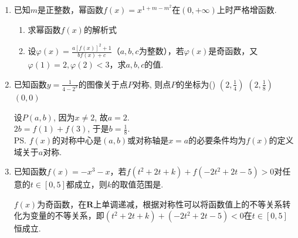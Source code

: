 \begin{enumerate}
\begin{jieda}
    \ps 任意一个关于定义域关于原点对称的函数都可以写成一个奇函数加上一个偶函数（包含其中之一为既奇又偶的情况）：$h(x) = \frac{h(x)+h(-x)}{2} + \frac{h(x) - h(-x)}{2}$
    \end{jieda}
    \item 已知$m$是正整数，幂函数$f(x) = x^{1+m-m^2}$在$(0, +\infty)$上时严格增函数.
\begin{enumerate}
    \item 求幂函数$f(x)$的解析式
    \item 设$\varphi(x) = \frac{a[f(x)]^2+1}{bf(x)+c}$（$a, b, c$为整数），若$\varphi(x)$是奇函数，又$\varphi(1) = 2, \varphi(2) < 3$，求$a, b, c$的值.
\end{enumerate}
\begin{jieda}
    \end{jieda}    
    \item 已知函数$y=\frac{1}{4-2^x}$的图像关于点$P$对称, 则点$P$的坐标为\dotfill()
    {$(2,\frac{1}{4})$}
    {$(2,\frac{1}{8})$}
    {$(0,0)$}
    \begin{jieda}
    设$P(a,b)$, 因为$x\neq 2$, 故$a=2$. \\
    $2b=f(1)+f(3)$, 于是$b=\frac{1}{8}$. \\
    \ps $f(x)$的对称中心是$(a, b)$或对称轴是$x = a$的必要条件均为$f(x)$的定义域关于$a$对称.
    \end{jieda}
    \item 已知函数$f(x) = -x^3-x$，若$f(t^2+2t+k)+f(-2t^2+2t-5)>0$对任意的$t \in [0, 5]$都成立，则$k$的取值范围是.
    \begin{jieda}
        $f(x)$为奇函数，在$\mathbf{R}$上单调递减，根据对称性可以将函数值上的不等关系转化为变量的不等关系，即$(t^2+2t+k)+(-2t^2+2t-5)<0$在$t \in [0, 5]$恒成立.\\

\end{jieda}
\end{enumerate}
